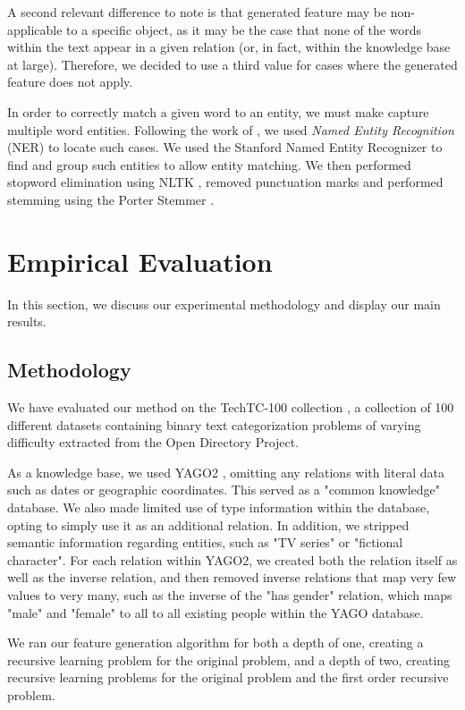 \documentclass{article}
\theoremstyle{definition}
\begin{document}
A second relevant difference to note is that generated feature may be non-applicable to a specific object, as it may be the case that none of the words within the text appear in a given relation (or, in fact, within the knowledge base at large). Therefore, we decided to use a third value for cases where the generated feature does not apply.

In order to correctly match a given word to an entity, we must make capture multiple word entities. Following the work of \citet{paulheim2012unsupervised}, we used \emph{Named Entity Recognition} (NER) to locate such cases. We used the Stanford Named Entity Recognizer \citep{finkel2005incorporating} to find and group such entities to allow entity matching. We then performed stopword elimination using NLTK \citep{bird2009natural} , removed punctuation marks and performed stemming using the Porter Stemmer \citep{van1980new}.


\section{Empirical Evaluation}
In this section, we discuss our experimental methodology and display our main results.
\subsection{Methodology}
We have evaluated our method on the TechTC-100 collection \citep{gabrilovich2004text}, a collection of 100 different datasets containing binary text categorization problems of varying difficulty extracted from the Open Directory Project.

As a knowledge base, we used YAGO2 \citep{hoffart2013yago2}, omitting any relations with literal data such as dates or geographic coordinates. This served as a "common knowledge" database. We also made limited use of type information within the database, opting to simply use it as an additional relation.
In addition, we stripped semantic information regarding entities, such as "TV series" or "fictional character". For each relation within YAGO2, we created both the relation itself as well as the inverse relation, and then removed inverse relations that map very few values to very many, such as the inverse of the "has gender" relation, which maps "male" and "female" to all to all existing people within the YAGO database.

We ran our feature generation algorithm for both a depth of one, creating a recursive learning problem for the original problem, and a depth of two, creating recursive learning problems for the original problem and the first order recursive problem.
\end{document}

